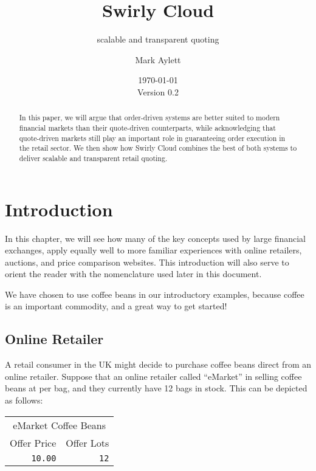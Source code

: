 \documentclass[12pt,a4paper,notitlepage,bibliography=totoc]{scrreprt}
\newcommand{\swirly}{Swirly Cloud}
\newcommand{\s}{\textsterling}
\begin{document}
\title{Swirly Cloud}
\subtitle{scalable and transparent quoting}
\author{Mark Aylett}
\date{\today\\Version 0.2}
\maketitle

\begin{abstract}

In this paper, we will argue that \gls{order-driven} systems are better suited to modern financial
\glspl{market} than their \gls{quote-driven} counterparts, while acknowledging that
\gls{quote-driven} \glspl{market} still play an important role in guaranteeing \gls{order} execution
in the retail sector. We then show how \swirly{} combines the best of both systems to deliver
scalable and transparent retail quoting.

\end{abstract}

\tableofcontents

\chapter{Introduction}

In this chapter, we will see how many of the key concepts used by large financial \glspl{exchange},
apply equally well to more familiar experiences with online retailers, \glspl{auction}, and
price comparison websites. This introduction will also serve to orient the reader with the
nomenclature used later in this document.

We have chosen to use coffee beans in our introductory examples, because coffee is an important
commodity, and a great way to get started!

\section{Online Retailer}

A retail consumer in the UK might decide to purchase coffee beans direct from an online
retailer. Suppose that an online retailer called ``eMarket'' in selling coffee beans at \s10.00 per
bag, and they currently have 12 bags in stock. This can be depicted as follows:

\vspace{5mm}
\begin{tabular}{rr}
\multicolumn{2}{c}{eMarket Coffee Beans}\\
Offer Price&Offer Lots\\
\hline
\texttt{10.00}&\texttt{12}\\
\end{tabular}
\vspace{5mm}
\end{document}
